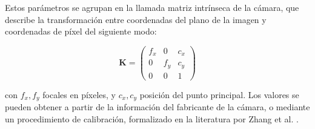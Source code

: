 Estos parámetros se agrupan en la llamada matriz intrínseca de la cámara, que describe la transformación entre coordenadas del plano de la imagen y coordenadas de píxel del siguiente modo:

\begin{equation}
\mathbf{K} =
\begin{pmatrix}
f_x & 0   & c_x \\
0   & f_y & c_y \\
0   & 0   & 1
\end{pmatrix}
\end{equation}

\noindent con $f_x, f_y$ focales en píxeles, y $c_x, c_y$ posición del punto principal. Los valores se pueden obtener a partir de la información del fabricante de la cámara, o mediante un procedimiento de calibración, formalizado en la literatura por Zhang et al. \cite{calibracion_camara}.
